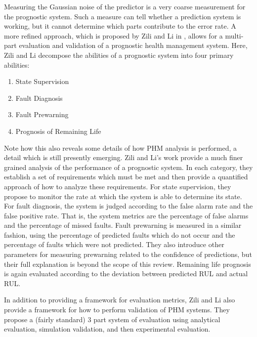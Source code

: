 \documentclass[12pt]{article}
\begin{document}
Measuring the Gaussian noise of the predictor is a very
coarse measurement for the prognostic system.  Such a measure can tell
whether a prediction system is working, but it cannot determine which
parts contribute to the error rate.  A more refined approach, which is
proposed by Zili and Li in \cite{5413560}, allows for a multi-part
evaluation and validation of a prognostic health management system.
Here, Zili and Li decompose the abilities of a prognostic system into
four primary abilities:
\begin{enumerate}
  \item State Supervision
  \item Fault Diagnosis
  \item Fault Prewarning
  \item Prognosis of Remaining Life
\end{enumerate}
Note how this also reveals some details of how PHM analysis is
performed, a detail which is still presently emerging.  Zili and Li's
work provide a much finer grained analysis of the performance of a
prognostic system.  In each category, they establish a set of
requirements which must be met and then provide a quantified approach
of how to analyze these requirements.  For state supervision, they
propose to monitor the rate at which the system is able to determine
its state.  For fault diagnosis, the system is judged according to the
false alarm rate and the false positive rate.  That is, the system
metrics are the percentage of false alarms and the percentage of
missed faults.  Fault prewarning is measured in a similar fashion,
using the percentage of predicted faults which do not occur and the
percentage of faults which were not predicted.  They also introduce
other parameters for measuring prewarning related to the confidence of
predictions, but their full explanation is beyond the scope of this
review.  Remaining life prognosis is again evaluated according to the
deviation between predicted RUL and actual RUL.

In addition to providing a framework for evaluation metrics, Zili and
Li also provide a framework for how to perform validation of PHM
systems.  They propose a (fairly standard) 3 part system of evaluation
using analytical evaluation, simulation validation, and then
experimental evaluation.
\end{document}
